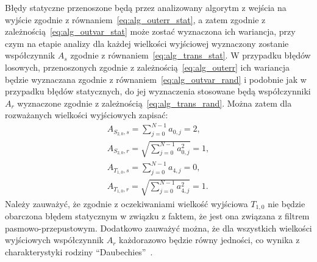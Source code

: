 Błędy statyczne przenoszone będą przez analizowany algorytm z wejścia na wyjście zgodnie z równaniem~\eqref{eq:alg_outerr_stat}, a zatem zgodnie z zależnością~\eqref{eq:alg_outvar_stat} może zostać wyznaczona ich wariancja, przy czym na etapie analizy dla każdej wielkości wyjściowej wyznaczony zostanie współczynnik $A_{s}$ zgodnie z równaniem~\eqref{eq:alg_trans_stat}. W przypadku błędów losowych, przenoszonych zgodnie z zależnością~\eqref{eq:alg_outerr} ich wariancja będzie wyznaczana zgodnie z równaniem~\eqref{eq:alg_outvar_rand} i podobnie jak w przypadku błędów statycznych, do jej wyznaczenia stosowane będą współczynniki $A_{r}$ wyznaczone zgodnie z zależnością~\eqref{eq:alg_trans_rand}. Można zatem dla rozważanych wielkości wyjściowych zapisać:
\begin{gather}
A_{S_{2,0},s} = \sum _{j = 0} ^{N-1} a_{0, j} = 2 \label{eq:sym_partd_output_as_S_2_0}, \\
A_{S_{2,0},r} = \sqrt{\sum _{j = 0} ^{N-1} a_{0, j}^{2}} = 1 \label{eq:sym_partd_output_ar_S_2_0}, \\
A_{T_{1,0},s} = \sum _{j = 0} ^{N-1} a_{4, j} = 0 \label{eq:sym_partd_output_as_T_1_0}, \\
A_{T_{1,0},r} = \sqrt{\sum _{j = 0} ^{N-1} a_{4, j}^{2}} = 1 \label{eq:sym_partd_output_ar_T_1_0}.
\end{gather}
Należy zauważyć, że zgodnie z oczekiwaniami wielkość wyjściowa $T_{1,0}$ nie będzie obarczona błędem statycznym w związku z faktem, że jest ona związana z filtrem pasmowo-przepustowym. Dodatkowo zauważyć można, że dla wszystkich wielkości wyjściowych współczynnik $A_{r}$ każdorazowo będzie równy jedności, co wynika z charakterystyki rodziny \enquote{Daubechies}~\cite{vonesch_dbbasics, wei_coiflet}.

